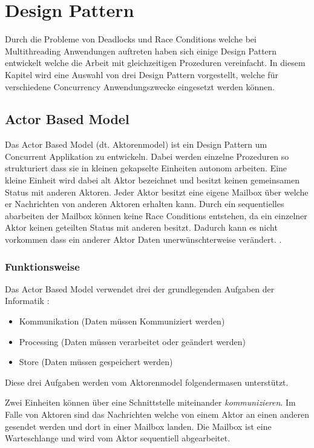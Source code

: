 \section{Design Pattern}

Durch die Probleme von Deadlocks und Race Conditions welche bei Multithreading Anwendungen auftreten haben sich einige Design Pattern entwickelt welche die Arbeit mit gleichzeitigen Prozeduren vereinfacht. In diesem Kapitel wird eine Auswahl von drei Design Pattern vorgestellt, welche für verschiedene Concurrency Anwendungszwecke eingesetzt werden können.

\subsection{Actor Based Model}
\label{section:Actor Based Model}

Das Actor Based Model (dt. Aktorenmodel) ist ein Design Pattern um Concurrent Applikation zu entwickeln. Dabei werden einzelne Prozeduren so strukturiert dass sie in kleinen gekapselte Einheiten autonom arbeiten. Eine kleine Einheit wird dabei alt Aktor bezeichnet und besitzt keinen gemeinsamen Status mit anderen Aktoren. Jeder Aktor besitzt eine eigene Mailbox über welche er Nachrichten von anderen Aktoren erhalten kann. Durch ein sequentielles abarbeiten der Mailbox können keine Race Conditions entstehen, da ein einzelner Aktor keinen geteilten Status mit anderen besitzt. Dadurch kann es nicht vorkommen dass ein anderer Aktor Daten unerwünschterweise verändert.  \cite[p. 84]{Erb2012}. 

\subsubsection{Funktionsweise}

Das Actor Based Model verwendet drei der grundlegenden Aufgaben der Informatik \cite[p. 85]{Erb2012}:

\begin{itemize}
  \item Kommunikation (Daten müssen Kommuniziert werden)
  \item Processing (Daten müssen verarbeitet oder geändert werden)
  \item Store (Daten müssen gespeichert werden)
\end{itemize}

Diese drei Aufgaben werden vom Aktorenmodel folgendermasen unterstützt.

Zwei Einheiten können über eine Schnittstelle miteinander \emph{kommunizieren}. Im Falle von Aktoren sind das Nachrichten welche von einem Aktor an einen anderen gesendet werden und dort in einer Mailbox landen. Die Mailbox ist eine Warteschlange und wird vom Aktor sequentiell abgearbeitet. 


